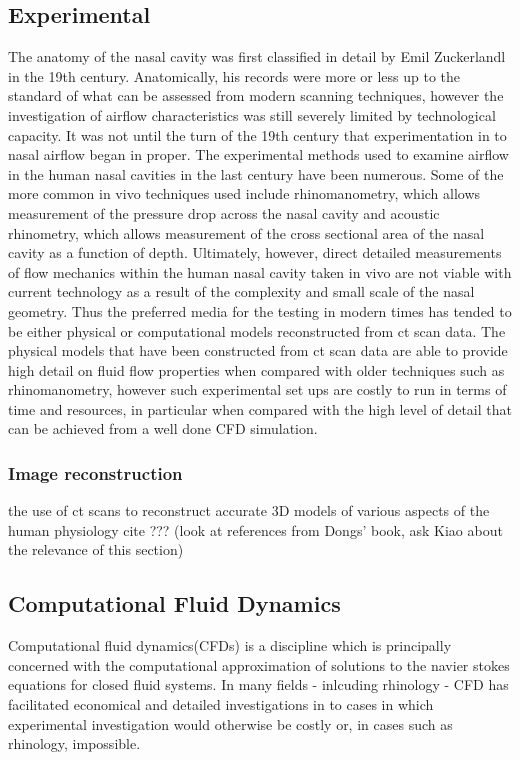 \documentclass{article}
\begin{document}
\subsection{Experimental}
The anatomy of the nasal cavity was first classified in detail by Emil Zuckerlandl in the 19th century\cite{Stammberger1989}. Anatomically, his records were more or less up to the standard of what can be assessed from modern scanning techniques\cite{Stammberger1989}, however the investigation of airflow characteristics was still severely limited by technological capacity\cite{Eccles2000}. It was not until the turn of the 19th century that experimentation in to nasal airflow began in proper\cite{Eccles2000}. The experimental methods used to examine airflow in the human nasal cavities in the last century have been numerous. Some of the more common in vivo techniques used include rhinomanometry, which allows measurement of the pressure drop across the nasal cavity\cite{Hilberg1989} and acoustic rhinometry, which allows measurement of the cross sectional area of the nasal cavity as a function of depth\cite{Hilberg1989}. Ultimately, however, direct detailed measurements of flow mechanics within the human nasal cavity taken in vivo are not viable with current technology as a result of the complexity and small scale of the nasal geometry\cite{Doorly2008c}. Thus the preferred media for the testing in modern times has tended to be either physical or computational models reconstructed from ct scan data\cite{Doorly2008c}. The physical models that have been constructed from ct scan data are able to provide high detail on fluid flow properties when compared with older techniques such as rhinomanometry\cite{Ma2009}, however such experimental set ups are costly to run in terms of time and resources, in particular when compared with the high level of detail that can be achieved from a well done CFD simulation\cite{Ma2009}.

\subsubsection{Image reconstruction}
the use of ct scans to reconstruct accurate 3D models of various aspects of the human physiology cite ??? (look at references from Dongs' book, ask Kiao about the relevance of this section)

\subsection{Computational Fluid Dynamics}
Computational fluid dynamics(CFDs) is a discipline which is principally concerned with the computational approximation of solutions to the navier stokes equations for closed fluid systems\cite{Tu2008}. In many fields - inlcuding rhinology - CFD has facilitated economical and detailed investigations in to cases in which experimental investigation would otherwise be costly or, in cases such as rhinology, impossible\cite{Keyhani1995}.
\end{document}
